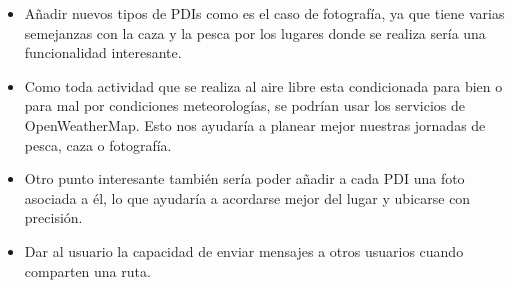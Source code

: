 \begin{itemize}
\item Añadir nuevos tipos de PDIs como es el caso de fotografía, ya que tiene varias semejanzas con la caza y la pesca por los lugares donde se realiza sería una funcionalidad interesante.
\item Como toda actividad que se realiza al aire libre esta condicionada para bien o para mal por condiciones meteorologías, se podrían usar los servicios de OpenWeatherMap. Esto nos ayudaría a planear mejor nuestras jornadas de pesca, caza o fotografía.


\item Otro punto interesante también sería poder añadir a cada PDI una foto asociada a él, lo que ayudaría a acordarse mejor del lugar y ubicarse con precisión.

\item Dar al usuario la capacidad de enviar mensajes a otros usuarios cuando comparten una ruta.



\end{itemize}
